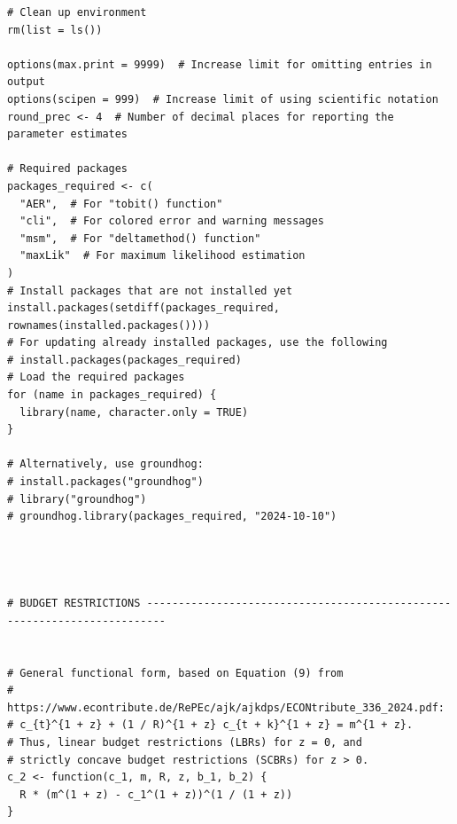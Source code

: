 \documentclass[11pt, a4paper, oneside]{article}
\theoremstyle{Plain}
\theoremstyle{Definition}
\theoremstyle{Remark}
\begin{document}
\begin{appendix}
\begin{lstlisting}
# Clean up environment
rm(list = ls())

options(max.print = 9999)  # Increase limit for omitting entries in output
options(scipen = 999)  # Increase limit of using scientific notation
round_prec <- 4  # Number of decimal places for reporting the parameter estimates

# Required packages
packages_required <- c(
  "AER",  # For "tobit() function"
  "cli",  # For colored error and warning messages
  "msm",  # For "deltamethod() function"
  "maxLik"  # For maximum likelihood estimation
)
# Install packages that are not installed yet
install.packages(setdiff(packages_required, rownames(installed.packages())))
# For updating already installed packages, use the following
# install.packages(packages_required)
# Load the required packages
for (name in packages_required) {
  library(name, character.only = TRUE)
}

# Alternatively, use groundhog:
# install.packages("groundhog")
# library("groundhog")
# groundhog.library(packages_required, "2024-10-10")




# BUDGET RESTRICTIONS -------------------------------------------------------------------------


# General functional form, based on Equation (9) from
# https://www.econtribute.de/RePEc/ajk/ajkdps/ECONtribute_336_2024.pdf:
# c_{t}^{1 + z} + (1 / R)^{1 + z} c_{t + k}^{1 + z} = m^{1 + z}.
# Thus, linear budget restrictions (LBRs) for z = 0, and
# strictly concave budget restrictions (SCBRs) for z > 0.
c_2 <- function(c_1, m, R, z, b_1, b_2) {
  R * (m^(1 + z) - c_1^(1 + z))^(1 / (1 + z))
}


\end{lstlisting}
\end{appendix}
\end{document}
